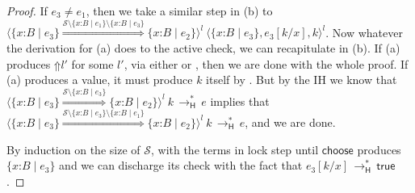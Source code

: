\documentclass[9pt]{extarticle}
\newcommand{\ottnt}[1]{\mathit{#1}}
\begin{document}
{\begin{lemma}
\begin{proof}
{    If $\ottnt{e_{{\mathrm{3}}}}  \neq  \ottnt{e_{{\mathrm{1}}}}$, then we take a similar step in (b) to
    $ \langle   \{ \mathit{x} \mathord{:} \ottnt{B} \mathrel{\mid} \ottnt{e_{{\mathrm{3}}}} \}   \mathord{ \overset{   \mathcal{S}  \setminus   \{ \mathit{x} \mathord{:} \ottnt{B} \mathrel{\mid} \ottnt{e_{{\mathrm{1}}}} \}    \setminus   \{ \mathit{x} \mathord{:} \ottnt{B} \mathrel{\mid} \ottnt{e_{{\mathrm{3}}}} \}   }{\Rightarrow} }   \{ \mathit{x} \mathord{:} \ottnt{B} \mathrel{\mid} \ottnt{e_{{\mathrm{2}}}} \}   \rangle^{ \ottnt{l} } ~   \langle   \{ \mathit{x} \mathord{:} \ottnt{B} \mathrel{\mid} \ottnt{e_{{\mathrm{3}}}} \}  ,   \ottnt{e_{{\mathrm{3}}}}  [  \ottnt{k} / \mathit{x}  ]  ,  \ottnt{k}  \rangle^{ \ottnt{l} }  $. Now whatever the derivation for (a) does
    to the active check, we can recapitulate in (b).
If (a) produces $ \mathord{\Uparrow}  \ottnt{l'} $ for some $\ottnt{l'}$, via either
     or , then we are done with the whole
    proof. If (a) produces a value, it must produce $\ottnt{k}$ itself by
    .
But by the IH we know that $ \langle   \{ \mathit{x} \mathord{:} \ottnt{B} \mathrel{\mid} \ottnt{e_{{\mathrm{3}}}} \}   \mathord{ \overset{  \mathcal{S}  \setminus   \{ \mathit{x} \mathord{:} \ottnt{B} \mathrel{\mid} \ottnt{e_{{\mathrm{3}}}} \}   }{\Rightarrow} }   \{ \mathit{x} \mathord{:} \ottnt{B} \mathrel{\mid} \ottnt{e_{{\mathrm{2}}}} \}   \rangle^{ \ottnt{l} } ~  \ottnt{k}  \,  \longrightarrow ^{*}_{  \mathsf{H}  }  \, \ottnt{e}$ implies that $ \langle   \{ \mathit{x} \mathord{:} \ottnt{B} \mathrel{\mid} \ottnt{e_{{\mathrm{3}}}} \}   \mathord{ \overset{   \mathcal{S}  \setminus   \{ \mathit{x} \mathord{:} \ottnt{B} \mathrel{\mid} \ottnt{e_{{\mathrm{3}}}} \}    \setminus   \{ \mathit{x} \mathord{:} \ottnt{B} \mathrel{\mid} \ottnt{e_{{\mathrm{1}}}} \}   }{\Rightarrow} }   \{ \mathit{x} \mathord{:} \ottnt{B} \mathrel{\mid} \ottnt{e_{{\mathrm{2}}}} \}   \rangle^{ \ottnt{l} } ~  \ottnt{k}  \,  \longrightarrow ^{*}_{  \mathsf{H}  }  \, \ottnt{e}$, and we are done.

    \else
    
    By induction on the size of $\mathcal{S}$, with the terms in lock step
    until $ \mathsf{choose} $ produces $ \{ \mathit{x} \mathord{:} \ottnt{B} \mathrel{\mid} \ottnt{e_{{\mathrm{3}}}} \} $ and we can discharge
    its check with the fact that $ \ottnt{e_{{\mathrm{3}}}}  [  \ottnt{k} / \mathit{x}  ]  \,  \longrightarrow ^{*}_{  \mathsf{H}  }  \,  \mathsf{true} $.

    \fi}
  \end{proof}
\end{lemma}

}
\end{document}
